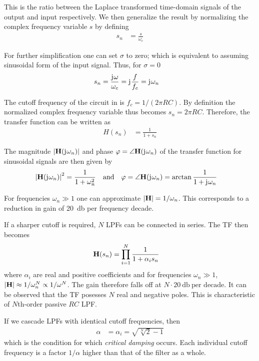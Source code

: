 This is the ratio between the Laplace transformed time-domain signals of the output and input respectively. We then generalize the result by normalizing the complex frequency variable $s$ by defining
\begin{align}
  s_n &= \frac{s}{\omega_c}
\end{align}

For further simplification one can set $\sigma$ to zero; which is equivalent to assuming sinusoidal form of the input signal.
Thus, for $\sigma=0$
\begin{align}
  s_n &= \frac{\mathrm{j}\mkern1mu\omega}{\omega_c} = \mathrm{j}\mkern1mu\frac{f}{f_c} = \mathrm{j}\mkern1mu\omega_n
\end{align}

The cutoff frequency of the circuit in  is $f_c=1/(2\pi RC)$. By definition the normalized complex frequency variable thus becomes $s_n=2\pi RC$. Therefore, the transfer function can be written as
\begin{align}
  H(s_n) &= \frac{1}{1+s_n}
\end{align}

The magnitude $\abs{\mathbf{H}(\mathrm{j}\mkern1mu\omega_n)}$ and phase $\varphi=\angle\mathbf{H}(\mathrm{j}\mkern1mu\omega_n)$ of the transfer function for sinusoidal signals are then given by
\begin{align}
  \abs{\mathbf{H}(\mathrm{j}\mkern1mu\omega_n)}^2 &= \frac{1}{1+\omega_n^2} &&\text{and} &\varphi &= \angle\mathbf{H}(\mathrm{j}\mkern1mu\omega_n) = \arctan\frac{1}{1 + \mathrm{j}\mkern1mu\omega_n}
\end{align}

For frequencies $\omega_n\gg 1$ one can approximate $\abs{\mathbf{H}}=1/\omega_n$. This corresponds to a reduction in gain of \SI{20}{\decibel} per frequency decade.

If a sharper cutoff is required, $N$ \ac{LPF}s can be connected in series. The \ac{TF} then becomes
\begin{align}
  \mathbf{H}(s_n) &= \prod\limits_{i=1}^{N}\frac{1}{1+\alpha_i s_n}
\end{align}
where $\alpha_i$ are real and positive coefficients and for frequencies $\omega_n\gg 1$, $\abs{\mathbf{H}}\approx 1/\omega_n^N\propto 1/\omega^N$. The gain therefore falls off at $N\cdot\SI{20}{\decibel}\:\text{per decade}$. It can be observed that the \ac{TF} posesses $N$ real and negative poles. This is characteristic of $N$th-order passive $RC$ \ac{LPF}.

If we cascade \ac{LPF}s with identical cutoff frequencies, then
\begin{align}
  \alpha &= \alpha_i = \sqrt{\sqrt[N]{2}-1}
\end{align}
which is the condition for which \emph{critical damping} occurs. Each individual cutoff frequency is a factor $1/\alpha$ higher than that of the filter as a whole.

